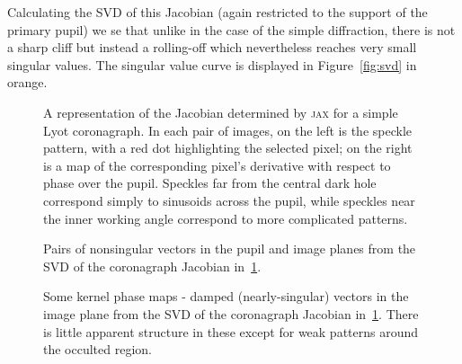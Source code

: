 \documentclass[modern]{aastex63}
\begin{document}
Calculating the SVD of this Jacobian (again restricted to the support of the primary pupil) we se that unlike in the case of the simple diffraction, there is not a sharp cliff but instead a rolling-off which nevertheless reaches very small singular values. The singular value curve is displayed in Figure~\ref{fig:svd} in orange. 

\begin{figure}
\caption{A representation of the Jacobian determined by \textsc{jax} for a simple Lyot coronagraph. In each pair of images, on the left is the speckle pattern, with a red dot highlighting the selected pixel; on the right is a map of the corresponding pixel's derivative with respect to phase over the pupil. Speckles far from the central dark hole correspond simply to sinusoids across the pupil, while speckles near the inner working angle correspond to more complicated patterns. \label{speckle_jacobian}}
\end{figure}


\begin{figure}
\caption{Pairs of nonsingular vectors in the pupil and image planes from the SVD of the coronagraph Jacobian in~\ref{speckle_jacobian}.
\label{nonsingular_corona}} 
\end{figure}

\begin{figure}
\caption{Some kernel phase maps - damped (nearly-singular) vectors in the image plane from the SVD of the coronagraph Jacobian in~\ref{speckle_jacobian}. There is little apparent structure in these except for weak patterns around the occulted region.
\label{kernel_corona}}
\end{figure}


\end{document}
